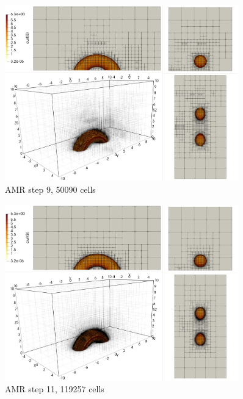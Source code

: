 \begin{figure}[H]
	\centering
	\includegraphics[width=0.9\textwidth]{img/td/td4.jpg}
\vspace{-2mm}
\caption{AMR step 9, 50090 cells}
\label{figure:myTd4}
\end{figure}
\vspace{-2mm}

\begin{figure}[H]
	\centering
	\includegraphics[width=0.9\textwidth]{img/td/td5.jpg}
\vspace{-2mm}
\caption{AMR step 11, 119257 cells}
\label{figure:myTd5}
\end{figure}
\vspace{-2mm}


